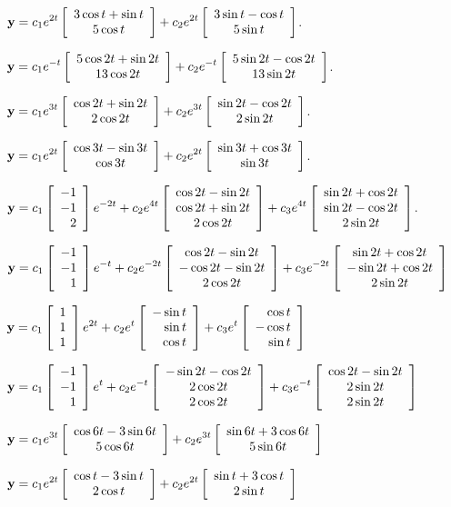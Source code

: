 \medskip

 ${\bf y}=\displaystyle{c_{1}e^{2t}\left[\begin{array}{c}3\cos t+\sin t\\5\cos t\end{array}\right]
+c_{2}e^{2t}\left[\begin{array}{c}3\sin t-\cos t\\5\sin t\end{array}\right]}$.

\smallskip
{}
 ${\bf y}=\displaystyle{c_{1}e^{-t}\left[\begin{array}{c}5\cos2t+\sin2t\\13\cos2t\end{array}\right]
+c_{2}e^{-t}\left[\begin{array}{c}5\sin2t-\cos2t\\13\sin2t\end{array}\right]}$.

\smallskip
{}
 ${\bf y}=\displaystyle{c_{1}e^{3t}\left[\begin{array}{c}\cos2t+\sin2t\\2\cos2t\end{array}\right]
+c_{2}e^{3t}\left[\begin{array}{c}\sin2t-\cos2t\\2\sin2t\end{array}\right]}$.

\smallskip
{}
 ${\bf y}=\displaystyle{c_{1}e^{2t}\left[\begin{array}{c}\cos3t-\sin3t\\\cos3t\end{array}\right]
+c_{2}e^{2t}\left[\begin{array}{c}\sin3t+\cos3t\\\sin3t\end{array}\right]}$.

\smallskip
{}
$\displaystyle{{\bf
y}=c_{1}\left[\begin{array}{r}-1\\-1\\2\end{array}\right]e^{-2t}+c_{2}e^{4t}\left[\begin{array}{c}\cos2t-\sin
2t\\\cos2t+\sin2t\\2\cos2t\end{array}\right]+c_{3}e^{4t}\left[\begin{array}{c}\sin2t+\cos2t\\\sin2t-\cos2t\\2\sin2t\end{array}\right]}$.

\smallskip
{}
 $\displaystyle{{\bf y}=c_{1}\left[\begin{array}{r}-1\\-1\\1\end{array}\right]e^{-t}+c_{2}e^{-2t}\left[\begin{array}{c}\cos2t-\sin
2t\\-\cos2t-\sin2t\\2\cos2t\end{array}\right]+c_{3}e^{-2t}\left[\begin{array}{c}\sin2t+\cos2t\\-\sin2t+\cos2t\\2\sin2t\end{array}\right]}$

\smallskip
{}
 $\displaystyle{{\bf y}=c_{1}\left[\begin{array}{r}1\\1\\1\end{array}\right]e^{2t}+c_{2}e^{t}\left[\begin{array}{r}-\sin
t\\\sin  t\\\cos t\end{array}\right]+c_{3}e^{t}\left[\begin{array}{r}\cos t\\-\cos t\\\sin t\end{array}\right]}$

\smallskip
{}
 $\displaystyle{{\bf y}=c_{1}\left[\begin{array}{r}-1\\-1\\1\end{array}\right]e^{t}+c_{2}e^{-t}\left[\begin{array}{c}-\sin
2t-\cos2t\\2\cos2t\\2\cos2t\end{array}\right]+c_{3}e^{-t}\left[\begin{array}{c}\cos2t-\sin2t\\2\sin2t\\2\sin2t\end{array}\right]}$

\smallskip
{}
$\displaystyle{{\bf y}=c_{1}e^{3t}\left[\begin{array}{c}\cos6t-3\sin6t
\\5\cos6t\end{array}\right]+
c_{2}e^{3t}\left[\begin{array}{c}
\sin6t+3\cos6t\\5\sin6t\end{array}\right]}$

\smallskip
{}
$\displaystyle{{\bf y}=c_{1}e^{2t}\left[\begin{array}{c}\cos t-3\sin t
\\2\cos t\end{array}\right]+
c_{2}e^{2t}\left[\begin{array}{c}
\sin t+3\cos t\\2\sin t\end{array}\right]}$

